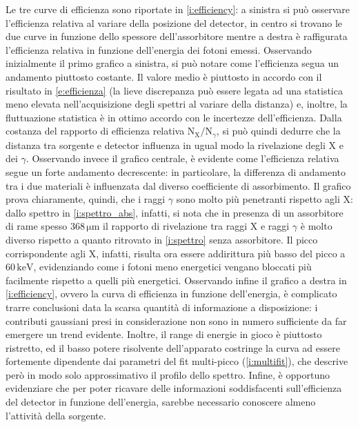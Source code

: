 \documentclass[twocolumn,10pt]{asme2ej}
\begin{document}
Le tre curve di efficienza sono riportate in \autoref{i:efficiency}: a sinistra si può osservare l'efficienza relativa
al variare della posizione del detector, in centro si trovano le due curve in funzione dello spessore dell'assorbitore
mentre a destra è raffigurata l'efficienza relativa in funzione dell'energia dei fotoni emessi. Osservando inizialmente
il primo grafico a sinistra, si può notare come l'efficienza segua un andamento piuttosto costante. Il valore medio è
piuttosto in accordo con il risultato in \autoref{e:efficienza} (la lieve discrepanza può essere legata ad una
statistica meno elevata nell'acquisizione degli spettri al variare della distanza) e, inoltre, la fluttuazione
statistica è in ottimo accordo con le incertezze dell'efficienza. Dalla costanza del rapporto di efficienza relativa
$\text{N}_{\text{X}}/\text{N}_{\gamma}$, si può quindi dedurre che la distanza tra sorgente e detector influenza in
ugual modo la rivelazione degli X e dei $\gamma$. Osservando invece il grafico centrale, è evidente come l'efficienza
relativa segue un forte andamento decrescente: in particolare, la differenza di andamento tra i due materiali è
influenzata dal diverso coefficiente di assorbimento. Il grafico prova chiaramente, quindi, che i raggi $\gamma$ sono
molto più penetranti rispetto agli X: dallo spettro in \autoref{i:spettro_abs}, infatti, si nota che in presenza di un
assorbitore di rame spesso $368\,\si{\micro\metre}$ il rapporto di rivelazione tra raggi X e raggi $\gamma$ è molto
diverso rispetto a quanto ritrovato in \autoref{i:spettro} senza assorbitore. Il picco corrispondente agli X, infatti,
risulta ora essere addirittura più basso del picco a $60\,\si{\kilo\electronvolt}$, evidenziando come i fotoni meno
energetici vengano bloccati più facilmente rispetto a quelli più energetici. Osservando infine il grafico a destra in
\autoref{i:efficiency}, ovvero la curva di efficienza in funzione dell'energia, è complicato trarre conclusioni data la
scarsa quantità di informazione a disposizione: i contributi gaussiani presi in considerazione non sono in numero
sufficiente da far emergere un trend evidente. Inoltre, il range di energie in gioco è piuttosto ristretto, ed il basso
potere risolvente dell'apparato costringe la curva ad essere fortemente dipendente dai parametri del fit multi-picco
(\autoref{i:multifit}), che descrive però in modo solo approssimativo il profilo dello spettro. Infine, è opportuno
evidenziare che per poter ricavare delle informazioni soddisfacenti sull'efficienza del detector in funzione
dell'energia, sarebbe necessario conoscere almeno l'attività della sorgente. 




\null
\vfill
\end{document}
